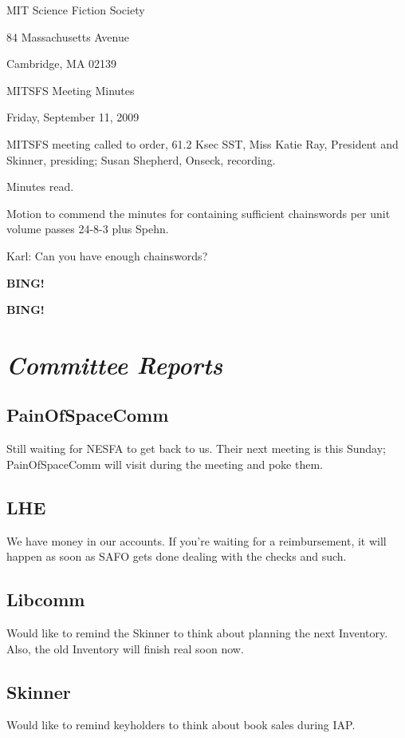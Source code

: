 \documentclass[10pt]{article}
\newcommand{\bing}{{\bf BING!} }
\newcommand{\goto}[1]{\bing \vskip 12pt \section*{{\em{#1}}}}
\newcommand{\ps}{ plus Spehn\xspace}
\begin{document}
\begin{center}

MIT Science Fiction Society

84 Massachusetts Avenue

Cambridge, MA 02139

\vspace{12pt}

MITSFS Meeting Minutes

Friday, September 11, 2009

\end{center}

\vspace{18pt}

\setlength{\parskip}{6pt}

\noindent
MITSFS meeting called to order, 61.2 Ksec SST,
Miss Katie Ray, President and Skinner, presiding; Susan Shepherd, Onseck, recording.

Minutes read.

Motion to commend the minutes for containing sufficient chainswords per unit volume passes 24-8-3 \ps.

Karl: Can you have enough chainswords?

\bing

\goto{Committee Reports}

\subsection*{PainOfSpaceComm}
Still waiting for NESFA to get back to us. Their next meeting is this Sunday; PainOfSpaceComm will visit during the meeting and poke them.

\subsection*{LHE}
We have money in our accounts. If you're waiting for a reimbursement, it will happen as soon as SAFO gets done dealing with the checks and such.

\subsection*{Libcomm}
Would like to remind the Skinner to think about planning the next Inventory. Also, the old Inventory will finish real soon now.

\subsection*{Skinner}
Would like to remind keyholders to think about book sales during IAP.
\end{document}
